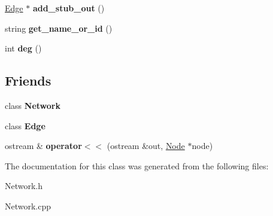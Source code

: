\begin{DoxyCompactItemize}
\item 
\hypertarget{classNode_af3783567e01db0103ae0390bff415702}{}\hyperlink{classEdge}{Edge} $\ast$ {\bfseries add\+\_\+stub\+\_\+out} ()\label{classNode_af3783567e01db0103ae0390bff415702}

\item 
\hypertarget{classNode_a6e7aed8cb6ae66ff068d7110035e54de}{}string {\bfseries get\+\_\+name\+\_\+or\+\_\+id} ()\label{classNode_a6e7aed8cb6ae66ff068d7110035e54de}

\item 
\hypertarget{classNode_a74c08535af7397231659eef64c13c55a}{}int {\bfseries deg} ()\label{classNode_a74c08535af7397231659eef64c13c55a}

\end{DoxyCompactItemize}
\subsection*{Friends}
\begin{DoxyCompactItemize}
\item 
\hypertarget{classNode_a88b59289ffd793fecd040d32e397b1e9}{}class {\bfseries Network}\label{classNode_a88b59289ffd793fecd040d32e397b1e9}

\item 
\hypertarget{classNode_ad2c8ba04c9d9989ccbf3c5aba267a3d7}{}class {\bfseries Edge}\label{classNode_ad2c8ba04c9d9989ccbf3c5aba267a3d7}

\item 
\hypertarget{classNode_a7e6dc53315296f7407916c5476c50917}{}ostream \& {\bfseries operator$<$$<$} (ostream \&out, \hyperlink{classNode}{Node} $\ast$node)\label{classNode_a7e6dc53315296f7407916c5476c50917}

\end{DoxyCompactItemize}


The documentation for this class was generated from the following files\+:\begin{DoxyCompactItemize}
\item 
Network.\+h\item 
Network.\+cpp\end{DoxyCompactItemize}
